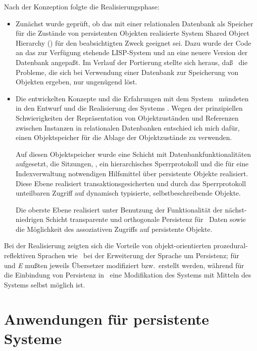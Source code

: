 %
Nach der Konzeption folgte die Realisierungsphase:
\begin{itemize}
%
\item Zun\"{a}chst wurde gepr\"{u}ft, ob das mit einer relationalen
Datenbank als Speicher f\"{u}r die Zu\-st\"{a}n\-de von persistenten
Objekten realisierte System Shared Object Hierarchy (\soh) f\"{u}r den
beabsichtigten Zweck geeignet sei. Dazu wurde der Code an das zur
Verf\"{u}gung stehende LISP-System und an eine neuere Version der
Datenbank angepa\ss{}t. Im Verlauf der Portierung stellte sich heraus,
da\ss{} \soh\ die Probleme, die sich bei Verwendung einer Datenbank zur
Speicherung von Objekten ergeben, nur ungen\"{u}gend l\"{o}st.
%
\item Die entwickelten Konzepte und die Erfahrungen mit dem System
\soh\ m\"{u}ndeten in den Entwurf und die Realisierung des Systems \plob.
Wegen der prinzipiellen Schwierigkeiten der Repr\"{a}sentation von
Objektzust\"{a}nden und Referenzen zwischen Instanzen in relationalen
Datenbanken entschied ich mich daf\"{u}r, einen Objektspeicher f\"{u}r die
Ablage der Objektzust\"{a}nde zu verwenden.
%
\par{}Auf diesen Objektspeicher wurde eine Schicht mit
Datenbankfunktionalit\"{a}ten aufgesetzt, die Sitzungen, \twophasetrs,
ein hierarchisches Sperrprotokoll und die f\"{u}r eine Indexverwaltung
notwendigen Hilfsmittel \"{u}ber persistente Objekte realisiert. 
Diese Ebene realisiert transaktionsgesicherten und durch das
Sperrprotokoll unteilbaren Zugriff auf dynamisch typisierte,
selbstbeschreibende Objekte.
%
\par{}Die oberste Ebene realisiert unter Benutzung der Funktionalit\"{a}t
der n\"{a}chst-niedrigen Schicht transparente und orthogonale
Persistenz f\"{u}r \cl\ Daten sowie die M\"{o}glichkeit des assoziativen
Zugriffs auf persistente Objekte.
%
\end{itemize}
%
Bei der Realisierung zeigten sich die Vorteile von objekt-orientierten
prozedural-reflektiven Sprachen wie \clos\ bei der Erweiterung der
Sprache um Persistenz; f\"{u}r \pascalr\
\cite[]{bib:schm77} und {\em E\/} \cite{bib:ri89} mu\ss{}ten
jeweils \"{U}bersetzer modifiziert bzw.\ erstellt werden, w\"{a}hrend f\"{u}r
die Einbindung von Persistenz in \clos\ eine Modifikation des Systems
mit Mitteln des Systems selbst m\"{o}glich ist.
%
\section{Anwendungen f\"{u}r persistente Systeme}
%
